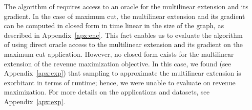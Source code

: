 The algorithm of  requires access to an oracle
for the multilinear extension and its gradient. In the case of maximum cut,
the multilinear extension and its gradient can be computed in closed form
in time linear in the size of the graph, as described in Appendix~\ref{apx:ene}. 
This fact enables us to evaluate
the algorithm of  using direct oracle access to the multilinear
extension and its gradient on the maximum cut application. However,
no closed form exists for the multilinear extension of
the revenue maximization objective. In this case, we found (see Appendix~\ref{apx:exp})
that sampling to approximate the multilinear extension is exorbitant in terms
of runtime; hence, we were unable to evaluate  on revenue maximization.
For more details on the applications and datasets, see
Appendix~\ref{apx:exp}.
